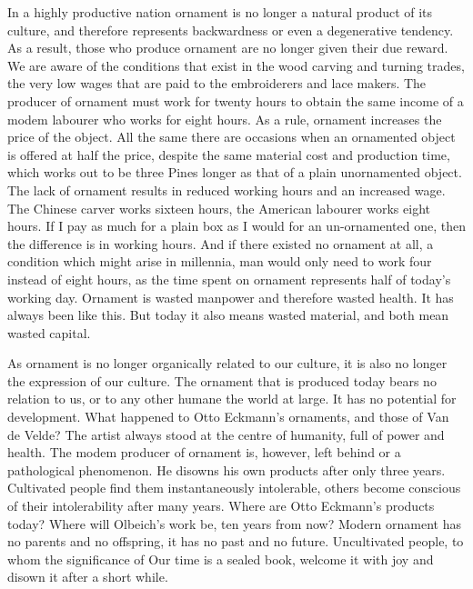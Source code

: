 \documentclass[a4paper]{article}
\begin{document}
In a highly productive nation ornament is no longer a natural product of its culture, and therefore represents backwardness or even a degenerative tendency. As a result, those who produce ornament are no longer given their due reward. We are aware of the conditions that exist in the wood carving and turning trades, the very low wages that are paid to the embroiderers and lace makers. The producer of ornament must work for twenty hours to obtain the same income of a modem labourer who works for eight hours. As a rule, ornament increases the price of the object. All the same there are occasions when an ornamented object is offered at half the price, despite the same material cost and production time, which works out to be three Pines longer as that of a plain unornamented object. The lack of ornament results in reduced working hours and an increased wage. The Chinese carver works sixteen hours, the American labourer works eight hours. If I pay as much for a plain box as I would for an un-ornamented one, then the difference is in working hours. And if there existed no ornament at all, a condition which might arise in millennia, man would only need to work four instead of eight hours, as the time spent on ornament represents half of today’s working day.
Ornament is wasted manpower and therefore wasted health. It has always been like this. But today it also means wasted material, and both mean wasted capital.

As ornament is no longer organically related to our culture, it is also no longer the expression of our culture. The ornament that is produced today bears no relation to us, or to any other humane the world at large. It has no potential for development. What happened to Otto Eckmann’s ornaments, and those of Van de Velde? The artist always stood at the centre of humanity, full of power and health. The modem producer of ornament is, however, left behind or a pathological phenomenon. He disowns his own products after only three years. Cultivated people find them instantaneously intolerable, others become conscious of their intolerability after many years. Where are Otto Eckmann’s products today? Where will Olbeich’s work be, ten years from now? Modern ornament has no parents and no offspring, it has no past and no future. Uncultivated people, to whom the significance of Our time is a sealed book, welcome it with joy and disown it after a short while.
\end{document}

